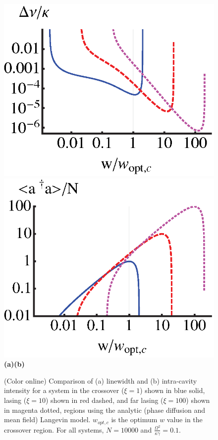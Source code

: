 \documentclass[aps,
twocolumn,
superscriptaddress,groupedaddress]{revtex4}
\begin{document}
{\begin{figure}
\begin{center}
	\includegraphics[scale =0.415] {LinewidthComparisonLangevin.eps}
	\hspace{-4mm} \includegraphics[scale =0.415] {adaComparisonLangevin.eps}\\
	\hspace{6mm}\textbf{(a)}\hspace{37mm}\textbf{(b)} \hspace{35mm}
\end{center}
		\vspace{-5mm}
\caption{(Color online) Comparison of (a) linewidth and (b) intra-cavity
intensity for a system in the crossover ($\xi=1$) shown in blue solid,
lasing ($\xi=10$) shown in red dashed, and far lasing ($\xi=100$) shown
in magenta dotted, regions using the analytic (phase diffusion and mean
field) Langevin model. $w_{opt,c}$ is the optimum $w$ value in the
crossover region. For all systems, $N=10000$ and $\frac{\Omega^2}{\kappa
\gamma}=0.1$.}
\label{LWadaComparison}
\end{figure}


}
\end{document}
